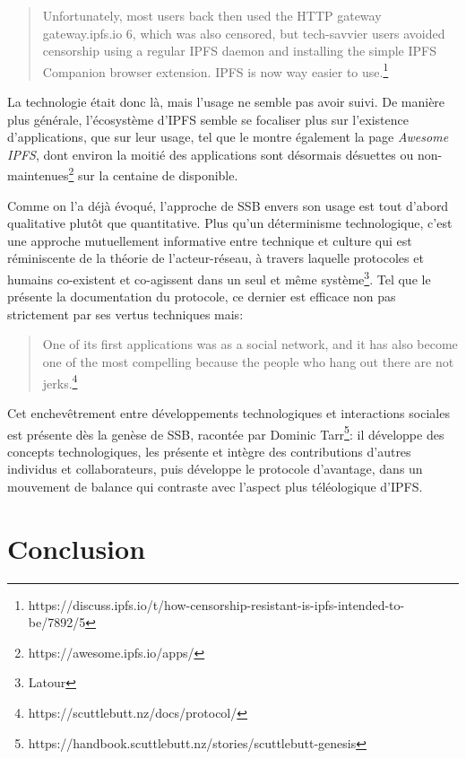 \documentclass{article}
\begin{document}
\begin{quote}
    Unfortunately, most users back then used the HTTP gateway gateway.ipfs.io 6, which was also censored, but tech-savvier users avoided censorship using a regular IPFS daemon and installing the simple IPFS Companion browser extension. IPFS is now way easier to use.\footnote{https://discuss.ipfs.io/t/how-censorship-resistant-is-ipfs-intended-to-be/7892/5}
\end{quote}

La technologie était donc là, mais l'usage ne semble pas avoir suivi. De manière plus générale, l'écosystème d'IPFS semble se focaliser plus sur l'existence d'applications, que sur leur usage, tel que le montre également la page \emph{Awesome IPFS}, dont environ la moitié des applications sont désormais désuettes ou non-maintenues\footnote{https://awesome.ipfs.io/apps/} sur la centaine de disponible.

Comme on l'a déjà évoqué, l'approche de SSB envers son usage est tout d'abord qualitative plutôt que quantitative. Plus qu'un déterminisme technologique, c'est une approche mutuellement informative entre technique et culture qui est réminiscente de la théorie de l'acteur-réseau, à travers laquelle protocoles et humains co-existent et co-agissent dans un seul et même système\footnote{Latour}. Tel que le présente la documentation du protocole, ce dernier est efficace non pas strictement par ses vertus techniques mais:

\begin{quote}
    One of its first applications was as a social network, and it has also become one of the most compelling because the people who hang out there are not jerks.\footnote{https://scuttlebutt.nz/docs/protocol/}
\end{quote}

Cet enchevêtrement entre développements technologiques et interactions sociales est présente dès la genèse de SSB, racontée par Dominic Tarr\footnote{https://handbook.scuttlebutt.nz/stories/scuttlebutt-genesis}: il développe des concepts technologiques, les présente et intègre des contributions d'autres individus et collaborateurs, puis développe le protocole d'avantage, dans un mouvement de balance qui contraste avec l'aspect plus téléologique d'IPFS.

\section{Conclusion}
\end{document}
